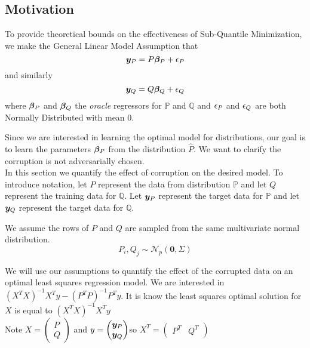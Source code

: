 \documentclass{article} %
\begin{document}
	\subsection{Motivation}
	\begin{assumption}\label{asm:normal-corruption}
		To provide theoretical bounds on the effectiveness of Sub-Quantile Minimization, we make the General Linear Model Assumption that
		\begin{equation}\vspace{1em}
			\vy_P = P\vbeta_P  + \eps_P
		\end{equation}
		and similarly 
		\begin{equation}
			{\bm{y}}_Q = Q {\bm{\beta}}_Q + {\epsilon}_Q
		\end{equation}
		where ${\bm{\beta}}_P$ and ${\bm{\beta}}_Q$ the \textit{oracle} regressors for $\mathbb{P}$ and $\mathbb{Q}$ and ${\epsilon}_P$ and ${\epsilon}_Q$ are both Normally Distributed with mean $0$.  
	\end{assumption}
	Since we are interested in learning the optimal model for distributions, our goal is to learn the parameters ${\bm{\beta}}_P$ from the distribution $\hat{P}$. We want to clarify the corruption is not adversarially chosen. \\
	In this section we quantify the effect of corruption on the desired model. To introduce notation, let $P$ represent the data from distribution $\mathbb{P}$ and let $Q$ represent the training data for $\mathbb{Q}$. Let ${\bm{y}}_P$ represent the target data for $\mathbb{P}$ and let ${\bm{y}}_Q$ represent the target data for $\mathbb{Q}$.\\
	\begin{assumption}\label{asm:p-q-sample}
		We assume the rows of $P$ and $Q$ are sampled from the same multivariate normal distribution. \vspace{1em}
		\begin{equation}
			P_i,Q_j \sim \mathcal{N}_p(\mathbf{0},\Sigma)
		\end{equation}
	\end{assumption}
	
	We will use our assumptions to quantify the effect of the corrupted data on an optimal least squares regression model. We are interested in $\displaystyle (X^T X)^{-1}X^T y - (P^T P)^{-1}P^T y$.
	It is know the least squares optimal solution for $X$ is equal to $(X^T X)^{-1}X^T y$\\
	Note $\displaystyle X = \begin{pmatrix}P \\ Q \end{pmatrix}$ and $\displaystyle y = \begin{pmatrix} {\bm{y}}_P \\ {\bm{y}}_Q \end{pmatrix} $so $X^T = \begin{pmatrix}P^T & Q^T \end{pmatrix}$\\
	
\end{document}
